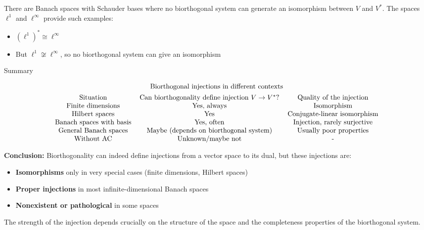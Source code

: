 \documentclass[aps,preprint]{revtex4}
\newenvironment{answer}
  {\begin{tcolorbox}[colback=green!5!white,colframe=green!75!black,title=Answer]}
  {\end{tcolorbox}}
\begin{document}
\begin{answer}
There are Banach spaces with Schauder bases where no biorthogonal system can
generate an isomorphism between $V$ and $V^*$. The spaces $\ell^1$ and $%
\ell^\infty$ provide such examples:

\begin{itemize}
\item $(\ell^1)^* \cong \ell^\infty$

\item But $\ell^1 \not\cong \ell^\infty$, so no biorthogonal system can give
an isomorphism
\end{itemize}

Summary

\begin{gather*}
\text{Biorthogonal injections in different contexts} \\
\begin{tabular}{ccc}
Situation & Can biorthogonality define injection $V\rightarrow V^{\ast }$? & 
Quality of the injection \\ 
Finite dimensions & Yes, always & Isomorphism \\ 
Hilbert spaces & Yes & Conjugate-linear isomorphism \\ 
Banach spaces with basis & Yes, often & Injection, rarely surjective \\ 
General Banach spaces & Maybe (depends on biorthogonal system) & Usually
poor properties \\ 
Without AC & Unknown/maybe not & -%
\end{tabular}%
\end{gather*}

\textbf{Conclusion:} Biorthogonality can indeed define injections from a
vector space to its dual, but these injections are:

\begin{itemize}
\item \textbf{Isomorphisms} only in very special cases (finite dimensions,
Hilbert spaces)

\item \textbf{Proper injections} in most infinite-dimensional Banach spaces

\item \textbf{Nonexistent or pathological} in some spaces
\end{itemize}

The strength of the injection depends crucially on the structure of the
space and the completeness properties of the biorthogonal system.
\end{answer}
\end{document}

